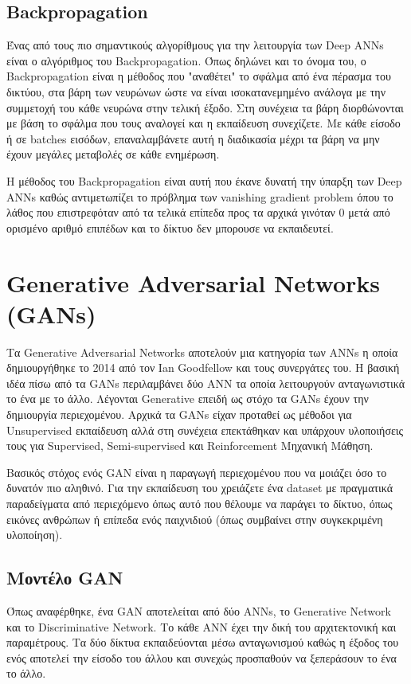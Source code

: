 \subsection{Backpropagation}
Ένας από τους πιο σημαντικούς αλγορίθμους για την λειτουργία των Deep ANNs είναι ο αλγόριθμος του Backpropagation. Όπως δηλώνει και το όνομα του, ο Backpropagation είναι η μέθοδος που "αναθέτει" το σφάλμα από ένα πέρασμα του δικτύου, στα βάρη των νευρώνων ώστε να είναι ισοκατανεμημένο ανάλογα με την συμμετοχή του κάθε νευρώνα στην τελική έξοδο. Στη συνέχεια τα βάρη διορθώνονται με βάση το σφάλμα που τους αναλογεί και η εκπαίδευση συνεχίζετε. Με κάθε είσοδο ή σε batches εισόδων, επαναλαμβάνετε αυτή η διαδικασία μέχρι τα βάρη να μην έχουν μεγάλες μεταβολές σε κάθε ενημέρωση.

\par
Η μέθοδος του  Backpropagation είναι αυτή που έκανε δυνατή την ύπαρξη των Deep ANNs καθώς αντιμετωπίζει το πρόβλημα των vanishing gradient problem όπου το λάθος που επιστρεφόταν από τα τελικά επίπεδα προς τα αρχικά γινόταν 0 μετά από ορισμένο αριθμό επιπέδων και το δίκτυο δεν μπορουσε να εκπαιδευτεί.




\section{Generative Adversarial Networks (GANs)}
Τα Generative Adversarial Networks αποτελούν μια κατηγορία των ANNs η οποία δημιουργήθηκε το 2014 από τον Ian Goodfellow και τους συνεργάτες του. Η βασική ιδέα πίσω από τα GANs περιλαμβάνει δύο ANN τα οποία λειτουργούν ανταγωνιστικά το ένα με το άλλο. Λέγονται Generative επειδή ως στόχο τα GANs έχουν την δημιουργία περιεχομένου. Αρχικά τα GANs είχαν προταθεί ως μέθοδοι για Unsupervised εκπαίδευση αλλά στη συνέχεια επεκτάθηκαν και υπάρχουν υλοποιήσεις τους για Supervised, Semi-supervised και Reinforcement Μηχανική Μάθηση. 
\par
Βασικός στόχος ενός GAN είναι η παραγωγή περιεχομένου που να μοιάζει όσο το δυνατόν πιο αληθινό. Για την εκπαίδευση του χρειάζετε ένα dataset με πραγματικά παραδείγματα από περιεχόμενο όπως αυτό που θέλουμε να παράγει το δίκτυο, όπως εικόνες ανθρώπων ή επίπεδα ενός παιχνιδιού (όπως συμβαίνει στην συγκεκριμένη υλοποίηση).

\subsection{Μοντέλο GAN}
Όπως αναφέρθηκε, ένα GAN αποτελείται από δύο ΑΝΝs, το Generative Network και το Discriminative Network. Το κάθε ANN έχει την δική του αρχιτεκτονική και παραμέτρους. Τα δύο δίκτυα εκπαιδεύονται μέσω ανταγωνισμού καθώς η έξοδος του ενός αποτελεί την είσοδο του άλλου και συνεχώς προσπαθούν να ξεπεράσουν το ένα το άλλο.


